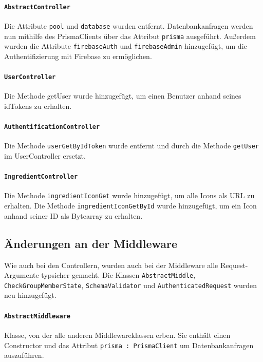 \documentclass{implementierungsheft}
\begin{document}
\paragraph{\texttt{AbstractController}} Die Attribute \texttt{pool} und \texttt{database} wurden entfernt. Datenbankanfragen werden nun mithilfe des PrismaClients über das Attribut \texttt{prisma} ausgeführt. 
Außerdem wurden die Attribute \texttt{firebaseAuth} und \texttt{firebaseAdmin} hinzugefügt, um die Authentifizierung mit Firebase zu ermöglichen.

\paragraph{\texttt{UserController}} Die Methode getUser wurde hinzugefügt, um einen Benutzer anhand seines idTokens zu erhalten.

\paragraph{\texttt{AuthentificationController}} Die Methode \texttt{userGetByIdToken} wurde entfernt und durch die Methode \texttt{getUser} im UserController ersetzt.

\paragraph{\texttt{IngredientController}} Die Methode \texttt{ingredientIconGet} wurde hinzugefügt, um alle Icons als URL zu erhalten. Die Methode \texttt{ingredientIconGetById} wurde hinzugefügt, um ein Icon anhand seiner ID als Bytearray zu erhalten.

\subsection{Änderungen an der Middleware} Wie auch bei den Controllern, wurden auch bei der Middleware alle Request-Argumente typsicher gemacht. Die Klassen \texttt{AbstractMiddle}, \texttt{CheckGroupMemberState}, \texttt{SchemaValidator} und \texttt{AuthenticatedRequest} wurden neu hinzugefügt.

\paragraph{\texttt{AbstractMiddleware}} Klasse, von der alle anderen Middlewareklassen erben. Sie enthält einen Constructor und das Attribut \texttt{prisma : PrismaClient} um Datenbankanfragen auszuführen.
\end{document}
